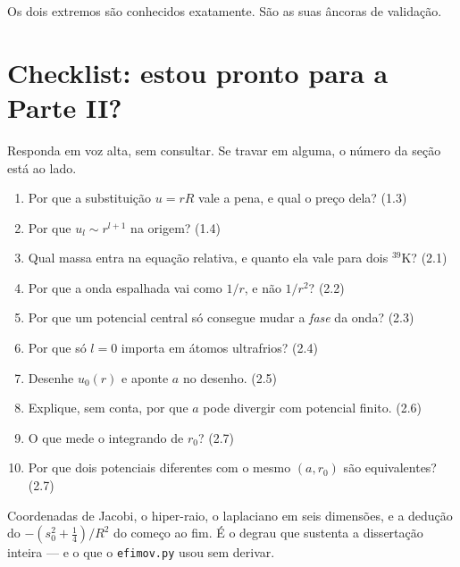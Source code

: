 \documentclass[11pt,a4paper]{article}
\begin{document}
Os dois extremos são conhecidos exatamente. São as suas âncoras de validação.

\section*{Checklist: estou pronto para a Parte II?}

Responda em voz alta, sem consultar. Se travar em alguma, o número da seção está ao
lado.

\begin{enumerate}[leftmargin=*, itemsep=3pt]
\item Por que a substituição $u=rR$ vale a pena, e qual o preço dela? \hfill (1.3)
\item Por que $u_{l}\sim r^{l+1}$ na origem? \hfill (1.4)
\item Qual massa entra na equação relativa, e quanto ela vale para dois $^{39}$K? \hfill (2.1)
\item Por que a onda espalhada vai como $1/r$, e não $1/r^{2}$? \hfill (2.2)
\item Por que um potencial central só consegue mudar a \emph{fase} da onda? \hfill (2.3)
\item Por que só $l=0$ importa em átomos ultrafrios? \hfill (2.4)
\item Desenhe $u_{0}(r)$ e aponte $a$ no desenho. \hfill (2.5)
\item Explique, sem conta, por que $a$ pode divergir com potencial finito. \hfill (2.6)
\item O que mede o integrando de $r_{0}$? \hfill (2.7)
\item Por que dois potenciais diferentes com o mesmo $(a,r_{0})$ são equivalentes? \hfill (2.7)
\end{enumerate}

\vspace{0.6cm}
\begin{ponte}
Coordenadas de Jacobi, o hiper-raio, o laplaciano em seis dimensões, e a dedução do
$-\left(s_{0}^{2}+\tfrac14\right)/R^{2}$ do começo ao fim. É o degrau que sustenta a
dissertação inteira — e o que o \texttt{efimov.py} usou sem derivar.
\end{ponte}
\end{document}

